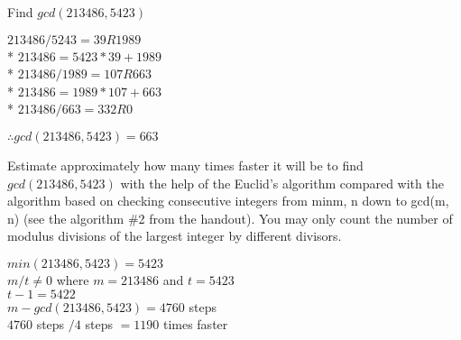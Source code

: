 \documentclass[12pt,largemargins]{homework}
\date{Septemeber 6, 2018}
\begin{document}
\maketitle
\normalsize

\question
  \begin{alphaparts}

  \item
    Find $gcd(213486, 5423)$

      $213486 / 5243 = 39 R 1989$ \\*
      $213486 = 5423 * 39 + 1989$ \\*
      $213486 / 1989 = 107 R 663$ \\*
      $213486 = 1989 * 107 + 663$ \\*
      $213486 / 663 = 332 R 0 $

    $\therefore gcd(213486,5423) = 663 $ 


  \item
    Estimate approximately how many times faster it will be to find
    $gcd(213486, 5423)$ with the help of the Euclid’s algorithm compared with the algorithm based on checking consecutive integers from min{m, n} down to gcd(m, n) (see the algorithm \#2 from the handout). You may only count the number of modulus divisions of the largest integer by different divisors.


      $min(213486,5423) = 5423$ \\
      $m/t \neq 0 $ where $m=213486$ and $ t=5423 $\\
      $t-1 = 5422 $ \\
      $m-gcd(213486, 5423) = 4760$ steps \\
      $4760$ steps $/4$ steps $=1190$ times faster 

\end{alphaparts}
\end{document}

